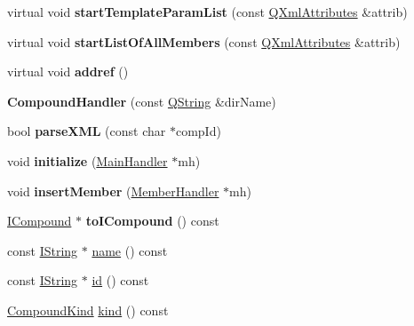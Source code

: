 \begin{DoxyCompactItemize}
virtual void {\bfseries start\+Template\+Param\+List} (const \mbox{\hyperlink{class_q_xml_attributes}{Q\+Xml\+Attributes}} \&attrib)
\item 
\mbox{\label{class_compound_handler_a56e1ac1a5207ad99998c3d3b4aadca6e}} 
virtual void {\bfseries start\+List\+Of\+All\+Members} (const \mbox{\hyperlink{class_q_xml_attributes}{Q\+Xml\+Attributes}} \&attrib)
\item 
\mbox{\label{class_compound_handler_a563d4e83ce0163c67c4091c9768c0bb8}} 
virtual void {\bfseries addref} ()
\item 
\mbox{\label{class_compound_handler_a8a94140e1979869bb0690db66aa1e044}} 
{\bfseries Compound\+Handler} (const \mbox{\hyperlink{class_q_string}{Q\+String}} \&dir\+Name)
\item 
\mbox{\label{class_compound_handler_a66b14cb056961d82e31bb6899e77d4a2}} 
bool {\bfseries parse\+X\+ML} (const char $\ast$comp\+Id)
\item 
\mbox{\label{class_compound_handler_a75adcf396f6b32137d69634f4edb48ad}} 
void {\bfseries initialize} (\mbox{\hyperlink{class_main_handler}{Main\+Handler}} $\ast$mh)
\item 
\mbox{\label{class_compound_handler_aa7418eb982356d814331f41ec1290bbd}} 
void {\bfseries insert\+Member} (\mbox{\hyperlink{class_member_handler}{Member\+Handler}} $\ast$mh)
\item 
\mbox{\label{class_compound_handler_aeec0ec6c7aa1fdaa4a9091d8230ea639}} 
\mbox{\hyperlink{class_i_compound}{I\+Compound}} $\ast$ {\bfseries to\+I\+Compound} () const
\item 
const \mbox{\hyperlink{class_i_string}{I\+String}} $\ast$ \mbox{\hyperlink{class_compound_handler_ac7c192318d397bf053bb3ee44903aca7}{name}} () const
\item 
const \mbox{\hyperlink{class_i_string}{I\+String}} $\ast$ \mbox{\hyperlink{class_compound_handler_ae9331f707437a480334f55471922ae13}{id}} () const
\item 
\mbox{\hyperlink{class_i_compound_a6b86be2ca9f6759434c1dd8405be328a}{Compound\+Kind}} \mbox{\hyperlink{class_compound_handler_a50629ddd5869657b611c3d170dd39cdb}{kind}} () const

\end{DoxyCompactItemize}

